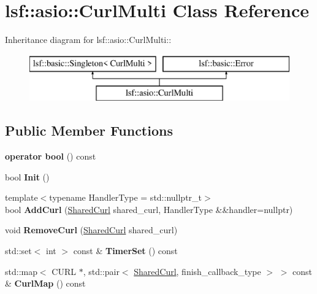 \hypertarget{classlsf_1_1asio_1_1CurlMulti}{
\section{lsf::asio::CurlMulti Class Reference}
\label{classlsf_1_1asio_1_1CurlMulti}
}
Inheritance diagram for lsf::asio::CurlMulti::\begin{figure}[H]
\begin{center}
\leavevmode
\includegraphics[height=2cm]{classlsf_1_1asio_1_1CurlMulti}
\end{center}
\end{figure}
\subsection*{Public Member Functions}
\begin{DoxyCompactItemize}
\item 
\hypertarget{classlsf_1_1asio_1_1CurlMulti_a705f919671c2674ddd94a3d6be765028}{
{\bfseries operator bool} () const }
\label{classlsf_1_1asio_1_1CurlMulti_a705f919671c2674ddd94a3d6be765028}

\item 
\hypertarget{classlsf_1_1asio_1_1CurlMulti_abb8c4083b9abdc3c37bd8682e93bc867}{
bool {\bfseries Init} ()}
\label{classlsf_1_1asio_1_1CurlMulti_abb8c4083b9abdc3c37bd8682e93bc867}

\item 
\hypertarget{classlsf_1_1asio_1_1CurlMulti_abaa3bd072f996193e59473e5459581b0}{
{\footnotesize template$<$typename HandlerType  = std::nullptr\_\-t$>$ }\\bool {\bfseries AddCurl} (\hyperlink{classlsf_1_1asio_1_1SharedCurl}{SharedCurl} shared\_\-curl, HandlerType \&\&handler=nullptr)}
\label{classlsf_1_1asio_1_1CurlMulti_abaa3bd072f996193e59473e5459581b0}

\item 
\hypertarget{classlsf_1_1asio_1_1CurlMulti_a2401849fa9cfcd81c7f3ae3e977a6473}{
void {\bfseries RemoveCurl} (\hyperlink{classlsf_1_1asio_1_1SharedCurl}{SharedCurl} shared\_\-curl)}
\label{classlsf_1_1asio_1_1CurlMulti_a2401849fa9cfcd81c7f3ae3e977a6473}

\item 
\hypertarget{classlsf_1_1asio_1_1CurlMulti_a41fb52fccc83320cc91c4fac3942fce6}{
std::set$<$ int $>$ const \& {\bfseries TimerSet} () const }
\label{classlsf_1_1asio_1_1CurlMulti_a41fb52fccc83320cc91c4fac3942fce6}

\item 
\hypertarget{classlsf_1_1asio_1_1CurlMulti_a1e78435ff82977848fff13ab26fce156}{
std::map$<$ CURL $\ast$, std::pair$<$ \hyperlink{classlsf_1_1asio_1_1SharedCurl}{SharedCurl}, finish\_\-callback\_\-type $>$ $>$ const \& {\bfseries CurlMap} () const }
\label{classlsf_1_1asio_1_1CurlMulti_a1e78435ff82977848fff13ab26fce156}

\end{DoxyCompactItemize}
